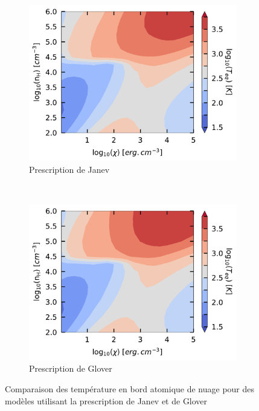 \begin{appendices}
\begin{figure}[!h]
    \centering
    \begin{subfigure}[t]{0.49\textwidth} %
        \centering \includegraphics[trim = {0 0 0 0 },clip,width=1\textwidth]{figure/H2/grid_janev/mapTba.pdf}
        \caption{Prescription de Janev}
    \end{subfigure}
    ~ 
    \begin{subfigure}[t]{0.49\textwidth}
        \centering \includegraphics[trim = {0 0 0 0 },clip,width=1\textwidth]{figure/H2/grid_glover/mapTba.pdf}
        \caption{Prescription de Glover}
    \end{subfigure}
    \caption{Comparaison des température en bord atomique de nuage pour des modèles utilisant la prescription de Janev et de Glover}
    \label{fig:H2:JanevGlover:Tba}
\end{figure}


\end{appendices}
